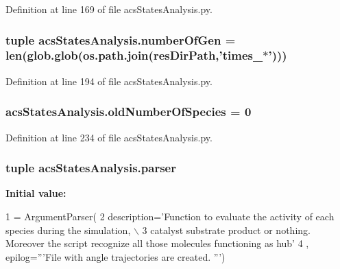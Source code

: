 Definition at line 169 of file acs\-States\-Analysis.\-py.

\hypertarget{a00099_a54acb4eba0735e72c2a820383febd37f}{
\subsubsection[{number\-Of\-Gen}]{\setlength{\rightskip}{0pt plus 5cm}tuple acs\-States\-Analysis.\-number\-Of\-Gen = len(glob.\-glob(os.\-path.\-join({\bf res\-Dir\-Path},'times\-\_\-$\ast$')))}}\label{a00099_a54acb4eba0735e72c2a820383febd37f}


Definition at line 194 of file acs\-States\-Analysis.\-py.

\hypertarget{a00099_abe1ce9bb85ee916d2046efc5c3fe6b30}{
\subsubsection[{old\-Number\-Of\-Species}]{\setlength{\rightskip}{0pt plus 5cm}acs\-States\-Analysis.\-old\-Number\-Of\-Species = 0}}\label{a00099_abe1ce9bb85ee916d2046efc5c3fe6b30}


Definition at line 234 of file acs\-States\-Analysis.\-py.

\hypertarget{a00099_ac24ead92a86e25ec9213d8c7253d4b60}{
\subsubsection[{parser}]{\setlength{\rightskip}{0pt plus 5cm}tuple acs\-States\-Analysis.\-parser}}\label{a00099_ac24ead92a86e25ec9213d8c7253d4b60}
{\bfseries Initial value\-:}
\begin{DoxyCode}
1 = ArgumentParser(
2                                 description=\textcolor{stringliteral}{'Function to evaluate the activity of each species during the
       simulation, \(\backslash\)}
3 \textcolor{stringliteral}{                                catalyst substrate product or nothing. Moreover the script recognize all
       those molecules functioning as hub'}
4                                 , epilog=\textcolor{stringliteral}{'''File with angle trajectories are created. '''})
\end{DoxyCode}


